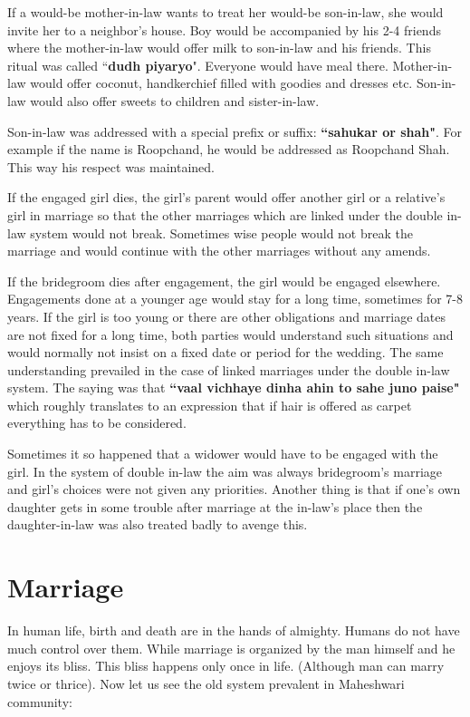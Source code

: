 If a would-be mother-in-law wants to treat her would-be son-in-law, she would
invite her to a neighbor's house. Boy would be accompanied by his 2-4 friends
where the mother-in-law would offer milk to son-in-law and his friends. This
ritual was called ``\textbf{dudh piyaryo}". Everyone would have meal there.
Mother-in-law would offer coconut, handkerchief filled with goodies and dresses
etc. Son-in-law would also offer sweets to children and sister-in-law. 

Son-in-law was addressed with a special prefix or suffix: \textbf{``sahukar or
shah"}. For example if the name is Roopchand, he would be addressed as
Roopchand Shah. This way his respect was maintained.

If the engaged girl dies, the girl's parent would offer another girl or a
relative's girl in marriage so that the other marriages which are linked under
the double in-law system would not break. Sometimes wise people would not break
the marriage and would continue with the other marriages without any amends.

If the bridegroom dies after engagement, the girl would be engaged elsewhere.
Engagements done at a younger age would stay for a long  time, sometimes for
7-8 years. If the girl is too young or there are other obligations and marriage
dates are not fixed for a long time, both parties would understand such
situations and would normally not insist on a fixed date or period for the
wedding. The same understanding prevailed in the case of linked marriages under
the double in-law system. The saying was that \textbf{``vaal vichhaye dinha
ahin to sahe juno paise"} which roughly translates to an expression that if
hair is offered as carpet everything has to be considered.

Sometimes it so happened that a widower would have to be engaged with  the
girl. In the system of double in-law the aim was always bridegroom's marriage and
girl's choices were not given any priorities. Another thing is that if one's
own daughter gets in some trouble after marriage at the in-law's place then the
daughter-in-law was also treated badly to avenge this.

\section{Marriage}
In human life, birth and death are in the hands of almighty. Humans do not have
much control over them. While marriage is organized by the man himself and he
enjoys its bliss. This bliss happens only once in life. (Although man can marry
twice or thrice). Now let us see the old system prevalent in Maheshwari
community:

